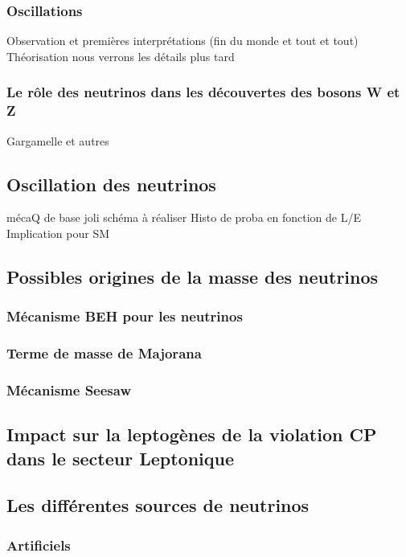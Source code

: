             \subsubsection{Oscillations}                
                Observation et premières interprétations (fin du monde et tout et tout)
                Théorisation
                nous verrons les détails plus tard
            \subsubsection{Le rôle des neutrinos dans les découvertes des bosons W et Z}
                Gargamelle et autres
        \subsection{Oscillation des neutrinos}
            mécaQ de base
            joli schéma à réaliser
            Histo de proba en fonction de L/E
            Implication pour SM
            
        \subsection{Possibles origines de la masse des neutrinos}
            \subsubsection{Mécanisme BEH pour les neutrinos}
            \subsubsection{Terme de masse de Majorana}
            \subsubsection{Mécanisme Seesaw}
            
        \subsection{Impact sur la leptogènes de la violation CP dans le secteur Leptonique}
        
        \subsection{Les différentes sources de neutrinos}
            \subsubsection{Artificiels}
